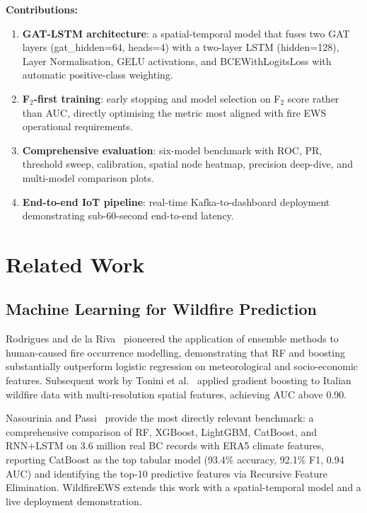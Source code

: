 \documentclass[conference]{IEEEtran}
\begin{document}
\noindent\textbf{Contributions:}
\begin{enumerate}[leftmargin=*, label=\arabic*.]
  \item \textbf{GAT-LSTM architecture}: a spatial-temporal model that fuses
        two GAT layers (gat\_hidden=64, heads=4) with a two-layer LSTM
        (hidden=128), Layer Normalisation, GELU activations, and
        BCEWithLogitsLoss with automatic positive-class weighting.
  \item \textbf{F$_2$-first training}: early stopping and model selection
        on F$_2$ score rather than AUC, directly optimising the metric
        most aligned with fire EWS operational requirements.
  \item \textbf{Comprehensive evaluation}: six-model benchmark with ROC,
        PR, threshold sweep, calibration, spatial node heatmap,
        precision deep-dive, and multi-model comparison plots.
  \item \textbf{End-to-end IoT pipeline}: real-time Kafka-to-dashboard
        deployment demonstrating sub-60-second end-to-end latency.
\end{enumerate}

\section{Related Work}
\label{sec:related}

\subsection{Machine Learning for Wildfire Prediction}
Rodrigues and de la Riva~\cite{rodrigues2014} pioneered the application of
ensemble methods to human-caused fire occurrence modelling, demonstrating that
RF and boosting substantially outperform logistic regression on meteorological
and socio-economic features. Subsequent work by Tonini et al.~\cite{tonini2020}
applied gradient boosting to Italian wildfire data with multi-resolution
spatial features, achieving AUC above 0.90.

Nasourinia and Passi~\cite{nasourinia2025} provide the most directly relevant
benchmark: a comprehensive comparison of RF, XGBoost, LightGBM, CatBoost, and
RNN+LSTM on 3.6 million real BC records with ERA5 climate features, reporting
CatBoost as the top tabular model (93.4\% accuracy, 92.1\% F1, 0.94 AUC) and
identifying the top-10 predictive features via Recursive Feature Elimination.
WildfireEWS extends this work with a spatial-temporal model and a live
deployment demonstration.
\end{document}
